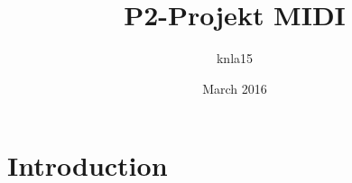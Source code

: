 \documentclass{article}
\title{P2-Projekt MIDI}
\author{knla15 }
\date{March 2016}
\begin{document}
\maketitle

\section{Introduction}
\end{document}
